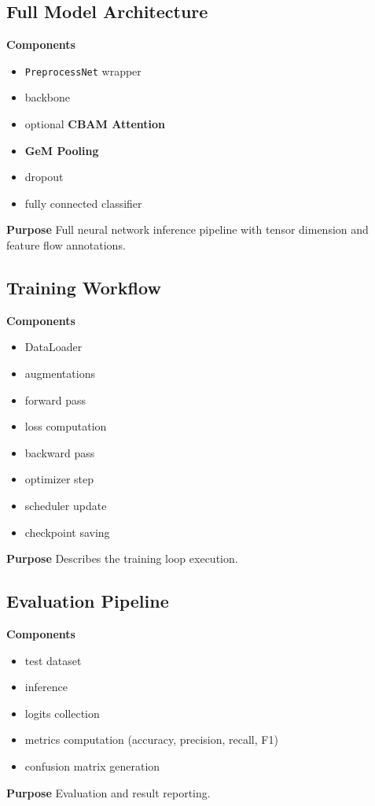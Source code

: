 \documentclass[11pt]{report}
\begin{document}
\subsection{Full Model Architecture}
\textbf{Components}
\begin{itemize}
  \item \texttt{PreprocessNet} wrapper
  \item backbone
  \item optional \textbf{CBAM Attention}
  \item \textbf{GeM Pooling}
  \item dropout
  \item fully connected classifier
\end{itemize}
\textbf{Purpose}
Full neural network inference pipeline with tensor dimension and feature flow annotations.

\subsection{Training Workflow}
\textbf{Components}
\begin{itemize}
  \item DataLoader
  \item augmentations
  \item forward pass
  \item loss computation
  \item backward pass
  \item optimizer step
  \item scheduler update
  \item checkpoint saving
\end{itemize}
\textbf{Purpose}
Describes the training loop execution.

\subsection{Evaluation Pipeline}
\textbf{Components}
\begin{itemize}
  \item test dataset
  \item inference
  \item logits collection
  \item metrics computation (accuracy, precision, recall, F1)
  \item confusion matrix generation
\end{itemize}
\textbf{Purpose}
Evaluation and result reporting.
\end{document}
